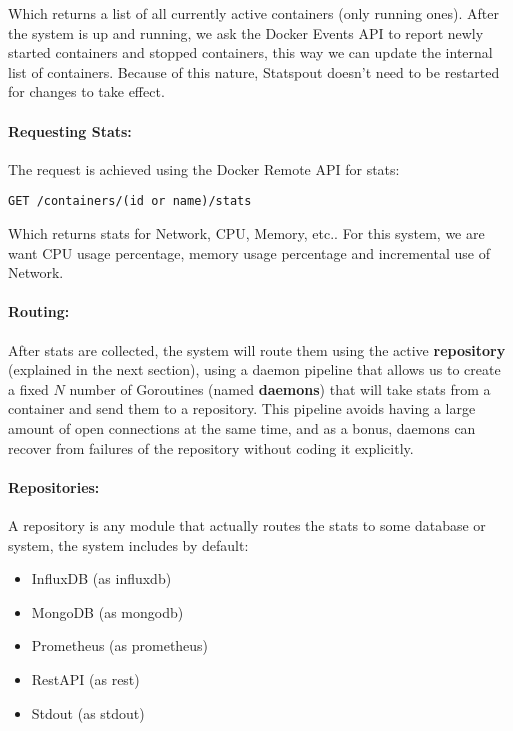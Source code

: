 Which returns a list of all currently active containers (only running ones). After the system is up and running, we ask the Docker Events API to report newly started containers and stopped containers, this way we can update the internal list of containers. Because of this nature, Statspout doesn't need to be restarted for changes to take effect.

\paragraph{Requesting Stats:} The request is achieved using the Docker Remote API for stats:

\begin{lstlisting}
GET /containers/(id or name)/stats
\end{lstlisting}

Which returns stats for Network, CPU, Memory, etc.. For this system, we are want CPU usage percentage, memory usage percentage and incremental use of Network.

\paragraph{Routing:} After stats are collected, the system will route them using the active \textbf{repository} (explained in the next section), using a daemon pipeline that allows us to create a fixed $N$ number of Goroutines (named \textbf{daemons}) that will take stats from a container and send them to a repository. This pipeline avoids having a large amount of open connections at the same time, and as a bonus, daemons can recover from failures of the repository without coding it explicitly.

\paragraph{Repositories:} A repository is any module that actually routes the stats to some database or system, the system includes by default:

\begin{itemize}
    \item InfluxDB (as influxdb)
    \item MongoDB (as mongodb)
    \item Prometheus (as prometheus)
    \item RestAPI (as rest)
    \item Stdout (as stdout)
\end{itemize}

